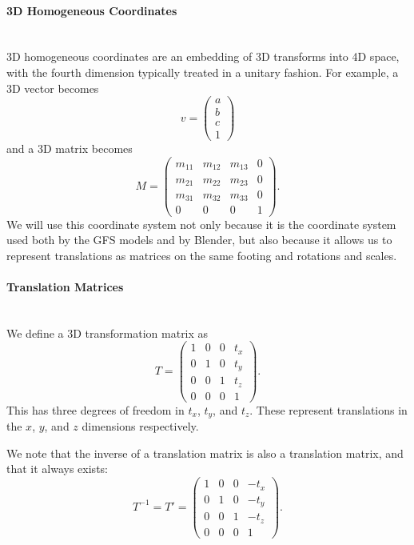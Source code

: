 \documentclass{article}
\begin{document}
\paragraph{3D Homogeneous Coordinates}\mbox{}\\
3D homogeneous coordinates are an embedding of 3D transforms into 4D space, with the fourth dimension typically treated in a unitary fashion. For example, a 3D vector becomes
\begin{equation}
v = \begin{pmatrix}
a\\
b\\
c\\
1
\end{pmatrix}
\end{equation}
and a 3D matrix becomes
\begin{equation}
M =
\begin{pmatrix}
m_{11} & m_{12} & m_{13} & 0\\
m_{21} & m_{22} & m_{23} & 0\\
m_{31} & m_{32} & m_{33} & 0\\
0 & 0 & 0 & 1
\end{pmatrix}.
\end{equation}
We will use this coordinate system not only because it is the coordinate system used both by the GFS models and by Blender, but also because it allows us to represent translations as matrices on the same footing and rotations and scales.

\paragraph{Translation Matrices}\mbox{}\\
We define a 3D transformation matrix as
\begin{equation}
T = \begin{pmatrix}
1 & 0 & 0 & t_x\\
0 & 1 & 0 & t_y\\
0 & 0 & 1 & t_z\\
0 & 0 & 0 & 1
\end{pmatrix}.
\end{equation}
This has three degrees of freedom in $t_x$, $t_y$, and $t_z$. These represent translations in the $x$, $y$, and $z$ dimensions respectively.

We note that the inverse of a translation matrix is also a translation matrix, and that it always exists:
\begin{equation}
T^{-1} = T' = \begin{pmatrix}
1 & 0 & 0 & -t_x\\
0 & 1 & 0 & -t_y\\
0 & 0 & 1 & -t_z\\
0 & 0 & 0 & 1
\end{pmatrix}.
\end{equation}
\end{document}
